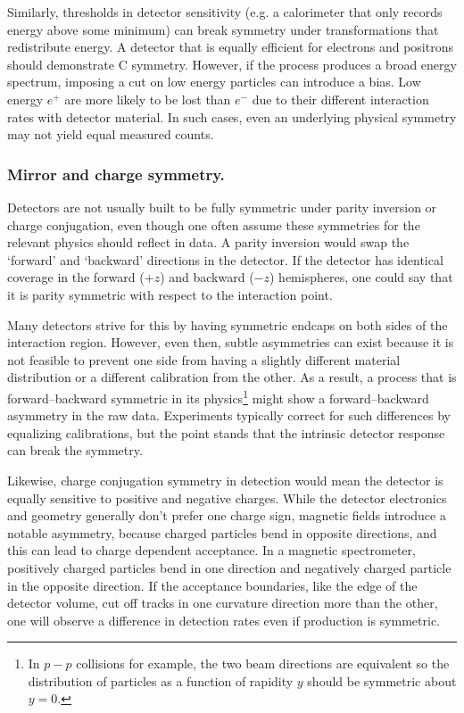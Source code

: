             Similarly, thresholds in detector sensitivity (e.g. a calorimeter that only records energy above some minimum) can break symmetry under transformations that redistribute energy.
A detector that is equally efficient for electrons and positrons should demonstrate C symmetry.
%
However, if the process produces a broad energy spectrum, imposing a cut on low energy particles can introduce a bias.
%
Low energy $e^+$ are more likely to be lost than $e^-$ due to their different interaction rates with detector material.
%
In such cases, even an underlying physical symmetry may not yield equal measured counts.

        \subsubsection{Mirror and charge symmetry.}
            Detectors are not usually built to be fully symmetric under parity inversion or charge conjugation, even though one often assume these symmetries for the relevant physics should reflect in data.
            A parity inversion would swap the `forward' and `backward' directions in the detector.
            If the detector has identical coverage in the forward ($+z$) and backward ($-z$) hemispheres, one could say that it is parity symmetric with respect to the interaction point.
            
            Many detectors strive for this by having symmetric endcaps on both sides of the interaction region.
            However, even then, subtle asymmetries can exist because it is not feasible to prevent one side from having a slightly different material distribution or a different calibration from the other.
            As a result, a process that is forward--backward symmetric in its physics\footnote{In $p-p$ collisions for example, the two beam directions are equivalent so the distribution of particles as a function of rapidity $y$ should be symmetric about $y=0$.} might show a forward--backward asymmetry in the raw data.
            Experiments typically correct for such differences by equalizing calibrations, but the point stands that the intrinsic detector response can break the symmetry.
            
            Likewise, charge conjugation symmetry in detection would mean the detector is equally sensitive to positive and negative charges.
            While the detector electronics and geometry generally don’t prefer one charge sign, magnetic fields introduce a notable asymmetry, because charged particles bend in opposite directions, and this can lead to charge dependent acceptance.
            In a magnetic spectrometer, positively charged particles bend in one direction and negatively charged particle in the opposite direction.
            If the acceptance boundaries, like the edge of the detector volume, cut off tracks in one curvature direction more than the other, one will observe a difference in detection rates even if production is symmetric.
            
